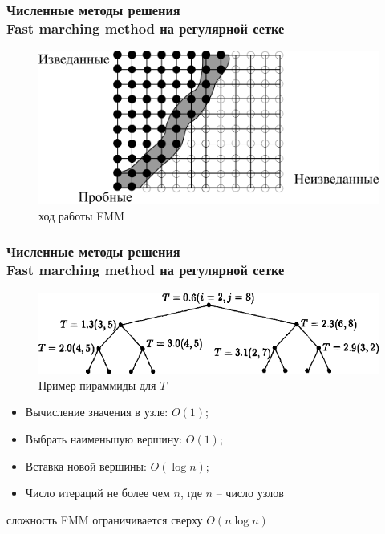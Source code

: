 \documentclass[hyperref={unicode=true},professionalfont]{beamer}
\newcommand{\stamp}{
	\begin{frame}[plain,noframenumbering]
		\begin{table}[h!]
			\flushright
			\vspace{5cm}
			\begin{adjustbox}{max width=0.7\textwidth}
				\begin{tabular}{
					|>{\footnotesize}p{0.8cm}|
					>{\footnotesize}p{0.8cm}|
					>{\footnotesize}p{2.2cm}|
					>{\footnotesize}p{1.1cm}|
					>{\footnotesize}p{0.8cm}|
					>{\footnotesize}p{5cm}|
					>{\footnotesize}p{0.1cm}|
					>{\footnotesize}p{0.1cm}|
					>{\footnotesize}p{0.1cm}|
					>{\footnotesize}p{0.8cm}|
					>{\footnotesize}p{1.4cm}|
				}
					\hline
					&&&&& \multicolumn{6}{>{\footnotesize}c|}{\multirow{3}{*}{\Large 0.043.00.00 ПЗ}} \\ \cline{1-5}
					&&&&& \multicolumn{6}{>{\footnotesize}c|}{} \\ \cline{1-5}
					Изм. & Лист & № Документа & Подпись & Дата & \multicolumn{6}{>{\footnotesize}c|}{} \\ \hline
					\multicolumn{2}{|>{\footnotesize}l|}{Разработал}
                    & Апанович Д.В. &  &  &
                                            \multirow{4}{5cm}{\centering
                                            Параллельный алгоритм
                                            численного решения
                                            анизотропного уравнения эйконала} & \multicolumn{3}{>{\footnotesize}l|}{Лит.} & Лист & Листов \\ \cline{1-5}\cline{7-11}
					\multicolumn{2}{|>{\footnotesize}l|}{Проверил}
                    & Казаков А.Л. &  &  &  & У & & & \insertframenumber & \inserttotalframenumber \\ \cline{1-5}\cline{7-11}
					\multicolumn{2}{|>{\footnotesize}l|}{Нормоконтролер}
                    & Казаков А.Л. &  &  &  & \multicolumn{5}{>{\footnotesize}l|}{} \\ \cline{1-5}
					\multicolumn{2}{|>{\footnotesize}l|}{} &  &  &  &  & \multicolumn{5}{>{\footnotesize}l|}{Кафедра АС, гр. ИСТм-16-1} \\ \cline{1-5}
					\multicolumn{2}{|>{\footnotesize}l|}{Утвердил}
                    & Бахвалов С.В. &  &  &  & \multicolumn{5}{>{\footnotesize}l|}{} \\ \hline

				\end{tabular}
			\end{adjustbox}
		\end{table}

	\end{frame}
}
\renewcommand{\stamp}{}
\begin{document}
\begin{frame}
\frametitle{Численные методы решения \\ Fast marching method на регулярной сетке}
\begin{figure}[ht]
  \centering
  \includegraphics[width=\linewidth]{fmm_explain.png}
  \hfil \caption{ход работы FMM}
  \label{fig:eikvis}

\end{figure}
\end{frame}
\stamp

\begin{frame}
  \frametitle{Численные методы решения \\ Fast marching method на
    регулярной сетке}
  \begin{figure}[ht]
  \centering
  \includegraphics[width=0.9\linewidth]{minheap.png}
  \hfil \caption{Пример пираммиды для $T$}
  \label{fig:eikvis}
\end{figure}
\begin{itemize}
  \item Вычисление значения в узле: $O(1)$;
  \item Выбрать наименьшую вершину: $O(1)$;
  \item Вставка новой вершины: $O(\log n)$;
  \item Число итераций не более чем $n$, где $n$ -- число узлов
  \end{itemize}

  сложность FMM
  ограничивается сверху $O(n \log n)$
  
\end{frame}
\stamp
\end{document}
